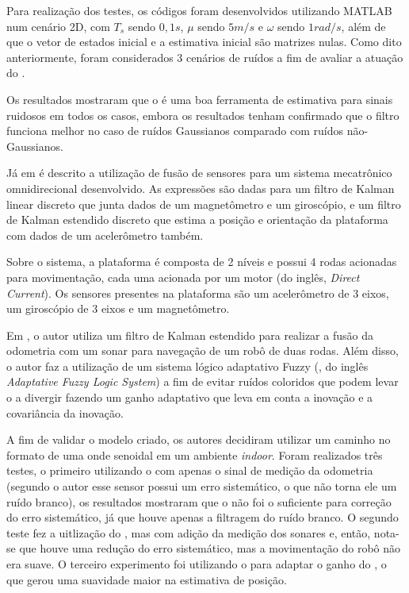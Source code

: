 \documentclass[acronym, symbols]{fei}
\begin{document}
	Para realização dos testes, os códigos foram desenvolvidos utilizando MATLAB num cenário 2D, com $T_s$ sendo $0,1s$, $\mu$ sendo $5m/s$ e $\omega$ sendo $1rad/s$, além de que o vetor de estados inicial e a estimativa inicial são matrizes nulas. Como dito anteriormente, foram considerados 3 cenários de ruídos a fim de avaliar a atuação do .
	
	Os resultados mostraram que o  é uma boa ferramenta de estimativa para sinais ruidosos em todos os casos, embora os resultados tenham confirmado que o filtro funciona melhor no caso de ruídos Gaussianos comparado com ruídos não-Gaussianos.
	
	Já em \textcite{korotaj2021kalman} é descrito a utilização de fusão de sensores para um sistema mecatrônico omnidirecional desenvolvido. As expressões são dadas para um filtro de Kalman linear discreto que junta dados de um magnetômetro e um giroscópio, e um filtro de Kalman estendido discreto que estima a posição e orientação da plataforma com dados de um acelerômetro também.
	
	Sobre o sistema, a plataforma é composta de 2 níveis e possui 4 rodas acionadas para movimentação, cada uma acionada por um motor  (do inglês, \textit{Direct Current}). Os sensores presentes na plataforma são um acelerômetro de 3 eixos, um giroscópio de 3 eixos e um magnetômetro.
	
	Em \textcite{sensorFusionKalmanFilter}, o autor utiliza um filtro de Kalman estendido para realizar a fusão da odometria com um sonar para navegação de um robô de duas rodas. Além disso, o autor faz a utilização de um sistema lógico adaptativo Fuzzy (, do inglês \textit{Adaptative Fuzzy Logic System}) a fim de evitar ruídos coloridos que podem levar o  a divergir fazendo um ganho adaptativo que leva em conta a inovação e a covariância da inovação.
	
	A fim de validar o modelo criado, os autores decidiram utilizar um caminho no formato de uma onde senoidal em um ambiente \textit{indoor}. Foram realizados três testes, o primeiro utilizando o  com apenas o sinal de medição da odometria (segundo o autor esse sensor possui um erro sistemático, o que não torna ele um ruído branco), os resultados mostraram que o  não foi o suficiente para correção do erro sistemático, já que houve apenas a filtragem do ruído branco. O segundo teste fez a uitlização do , mas com adição da medição dos sonares e, então, nota-se que houve uma redução do erro sistemático, mas a movimentação do robô não era suave. O terceiro experimento foi utilizando o  para adaptar o ganho do , o que gerou uma suavidade maior na estimativa de posição.
	
\end{document}
